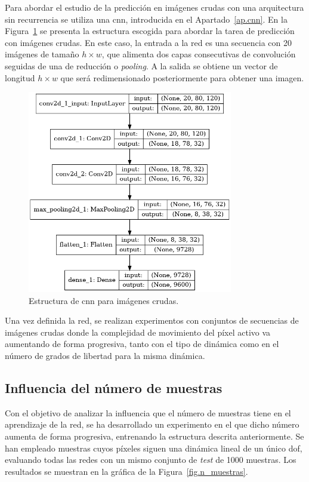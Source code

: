 Para abordar el estudio de la predicción en imágenes crudas con una arquitectura sin recurrencia se utiliza una \acrshort{cnn}, introducida en el Apartado~\ref{ap.cnn}. En la Figura~\ref{fig.cnn_raw} se presenta la estructura escogida para abordar la tarea de predicción con imágenes crudas. En este caso, la entrada a la red es una secuencia con 20 imágenes de tamaño $h \times w$, que alimenta dos capas consecutivas de convolución seguidas de una de reducción o \textit{pooling}. A la salida se obtiene un vector de longitud $h \times w$ que será redimensionado posteriormente para obtener una imagen.
\begin{figure}[H]
		\begin{center}
			\includegraphics[width=0.8\textwidth]{ figures/net/NOREC_simple_raw.png}
			\caption{Estructura de \acrshort{cnn} para imágenes crudas.}
			\label{fig.cnn_raw}
		\end{center}
\end{figure}
\vspace{-10pt}

Una vez definida la red, se realizan experimentos con conjuntos de secuencias de imágenes crudas donde la complejidad de movimiento del píxel activo va aumentando de forma progresiva, tanto con el tipo de dinámica como en el número de grados de libertad para la misma dinámica.

\subsection{Influencia del número de muestras}
Con el objetivo de analizar la influencia que el número de muestras tiene en el aprendizaje de la red, se ha desarrollado un experimento en el que dicho número aumenta de forma progresiva, entrenando la estructura descrita anteriormente. Se han empleado muestras cuyos píxeles siguen una dinámica lineal de un único \acrshort{dof}, evaluando todas las redes con un mismo conjunto de \textit{test} de 1000 muestras. Los resultados se muestran en la gráfica de la Figura~\ref{fig.n_muestras}.

